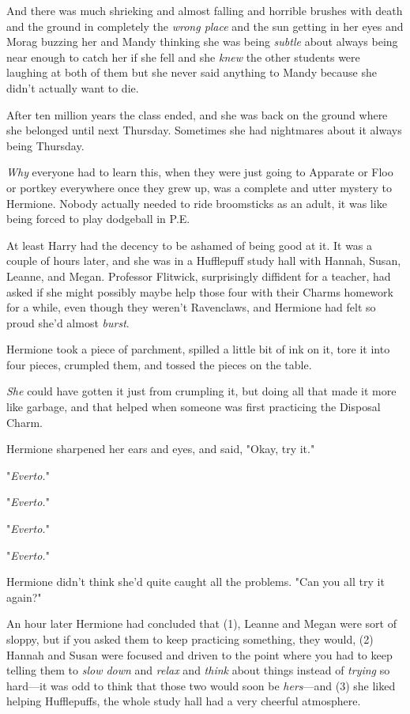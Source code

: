 And there was much shrieking and almost falling and horrible brushes with death 
and the ground in completely the \emph{wrong place} and the sun getting in her 
eyes and Morag buzzing her and Mandy thinking she was being \emph{subtle} about 
always being near enough to catch her if she fell and she \emph{knew} the other 
students were laughing at both of them but she never said anything to Mandy 
because she didn't actually want to die.

After ten million years the class ended, and she was back on the ground where 
she belonged until next Thursday. Sometimes she had nightmares about it always 
being Thursday.

\emph{Why} everyone had to learn this, when they were just going to Apparate or 
Floo or portkey everywhere once they grew up, was a complete and utter mystery 
to Hermione. Nobody actually needed to ride broomsticks as an adult, it was 
like being forced to play dodgeball in P.E.

At least Harry had the decency to be ashamed of being good at it.
\sbreak
It was a couple of hours later, and she was in a Hufflepuff study hall with 
Hannah, Susan, Leanne, and Megan. Professor Flitwick, surprisingly diffident 
for a teacher, had asked if she might possibly maybe help those four with their 
Charms homework for a while, even though they weren't Ravenclaws, and Hermione 
had felt so proud she'd almost \emph{burst}.

Hermione took a piece of parchment, spilled a little bit of ink on it, tore it 
into four pieces, crumpled them, and tossed the pieces on the table.

\emph{She} could have gotten it just from crumpling it, but doing all that made 
it more like garbage, and that helped when someone was first practicing the 
Disposal Charm.

Hermione sharpened her ears and eyes, and said, "Okay, try it."

"\emph{Everto.}"

"\emph{Everto.}"

"\emph{Everto.}"

"\emph{Everto.}"

Hermione didn't think she'd quite caught all the problems. "Can you all try it 
again?"

An hour later Hermione had concluded that (1), Leanne and Megan were sort of 
sloppy, but if you asked them to keep practicing something, they would, (2) 
Hannah and Susan were focused and driven to the point where you had to keep 
telling them to \emph{slow down} and \emph{relax} and \emph{think} about things 
instead of \emph{trying} so hard---it was odd to think that those two would 
soon be \emph{hers}---and (3) she liked helping Hufflepuffs, the whole study 
hall had a very cheerful atmosphere.

